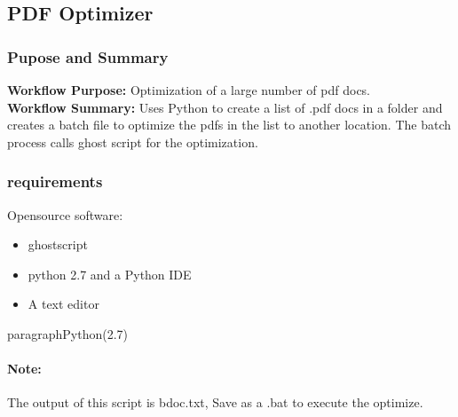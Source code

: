 \documentclass[class=article , crop=false, titlepage, twoside, multi={itemize, figure, verbatim}, float=false]{standalone}
\title{}  %
\begin{document}

\ifstandalone
\maketitle %
\clearpage
\tableofcontents %
\clearpage
\fi

\clearpage

\subsection{PDF Optimizer}
\subsubsection{Pupose and Summary}
\textbf{Workflow Purpose:} Optimization of a large number of pdf docs.\\
\textbf{Workflow Summary:} Uses Python to create a list of .pdf docs in a folder and creates a batch file to optimize the pdfs in the list to another location.  The batch process calls ghost script for the optimization.

\subsubsection{requirements}
Opensource software:
\begin{itemize}
\item ghostscript
\item python 2.7 and a Python IDE
\item A text editor
\end{itemize}
paragraph{Python(2.7)}

\paragraph*{Note:} The output of this script is bdoc.txt, Save as a .bat to execute the optimize.
\end{document}
